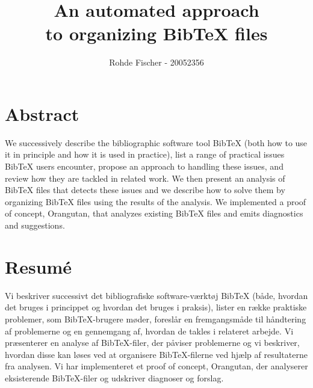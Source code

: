 \documentclass[twoside,11pt,openright,a4paper]{report}
\newcommand{\orangutan}{Orangutan}
\newcommand{\bibtex}{Bib{\TeX}}
\begin{document}
\pagestyle{empty}
\begin{titlepage}
\author{Rohde Fischer - 20052356}
\title{An automated approach\\to organizing {\bibtex} files}
\maketitle

\end{titlepage}


\pagestyle{plain}
\setcounter{page}{1}


\chapter*{Abstract}

We successively describe the bibliographic software tool {\bibtex}
(both how to use it in principle and how it is used in practice), list
a range of practical issues {\bibtex} users encounter, propose an
approach to hand\-ling these issues, and review how they are tackled
in related work.  We then present an analysis of {\bibtex} files that
detects these issues and we describe how to solve them by organizing
{\bibtex} files using the results of the analysis.  We implemented a
proof of concept, {\orangutan}, that analyzes existing {\bibtex} files
and emits diagnostics and suggestions.


\chapter*{Resumé}

Vi beskriver successivt det bibliografiske software-værktøj {\bibtex}
(både, hvordan det bruges i princippet og hvordan det bruges i
praksis), lister en række praktiske problemer, som {\bibtex}-brugere
møder, foreslår en fremgangsmåde til håndtering af problemerne og en
gennemgang af, hvordan de takles i relateret arbejde.  Vi præsenterer
en analyse af {\bibtex}-filer, der påviser problemerne og vi
beskriver, hvordan disse kan løses ved at organisere
{\bibtex}-filerne ved hjælp af resultaterne fra analysen.  Vi har
implementeret et proof of concept, {\orangutan}, der analyserer
eksisterende {\bibtex}-filer og udskriver diagnoser og forslag.
\end{document}
